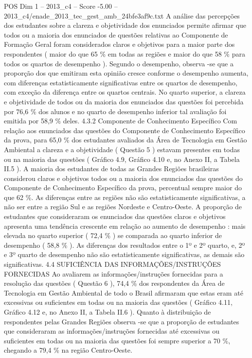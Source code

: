 \begin{textsample}{POS Dim 1 – 2013\_c4 – Score -5.00 – 2013\_c4/enade\_2013\_tec\_gest\_amb\_24bfe3af9c.txt}
A análise das percepções dos estudantes sobre a clareza e objetividade dos enunciados permite afirmar que todos ou a maioria dos enunciados de questões relativas ao Componente de Formação Geral foram considerados claros e objetivos para a maior parte dos respondentes ( maior do que 65 \% em todas as regiões e maior do que 58 \% para todos os quartos de desempenho ).
Segundo o desempenho, observa -se que a proporção dos que emitiram esta opinião cresce conforme o desempenho aumenta, com diferenças estatisticamente significativas entre os quartos de desempenho, com exceção da diferença entre os quartos centrais.
No quarto superior, a clareza e objetividade de todos ou da maioria dos enunciados das questões foi percebida por 76,6 \% dos alunos e no quarto de desempenho inferior tal avaliação foi emitida por 58,9 \% deles. 4.3.2 Componente de Conhecimento Específico Com relação aos enunciados das questões do Componente de Conhecimento Específico da prova, para 65,0 \% dos estudantes avaliados da Área de Tecnologia em Gestão Ambiental a clareza e a objetividade ( Questão 5 ) estavam presentes em todas ou na maioria das questões ( Gráfico 4.9, Gráfico 4.10 e, no Anexo II, a Tabela II.5 ).
A maioria dos estudantes de todas as Grandes Regiões brasileiras considerou claros e objetivos todos ou a maioria dos enunciados das questões do Componente de Conhecimento Específico da prova, percentual sempre maior do que 62 \%.
As diferenças entre as regiões não são estatisticamente significativas, a não ser entre a região Sul e as regiões Nordeste e Centro-Oeste.
A proporção de estudantes que consideraram os enunciados das questões claros e objetivos apresenta uma tendência crescente em relação ao aumento de desempenho : mais elevada no quarto superior ( 72,4 \% ) se comparada ao quarto inferior de desempenho ( 58,8 \% ).
As diferenças dos resultados entre o 1º e 2º quarto, e, 2º e 3º quarto de desempenho não são estatisticamente significativas, as demais são significativas. 4.4 SUFICIÊNCIA DAS INFORMAÇÕES/INSTRUÇÕES FORNECIDAS Ao avaliarem as informações/instruções fornecidas para a resolução das questões ( Questão 6 ), 74,4 \% dos respondentes da Área de Tecnologia em Gestão Ambiental de todo o Brasil afirmaram que estas eram até excessivas ou suficientes em todas ou na maioria das questões ( Gráfico 4.11, Gráfico 4.12 e, no Anexo II, a Tabela II.6 ).
Quanto à distribuição de respondentes pelas Grandes Regiões observa -se que a proporção de estudantes que consideraram as informações/instruções fornecidas até excessivas ou suficientes em todas ou na maioria das questões foi sempre superior a 70 \%, chegando a 79,4 \% na região Centro-Oeste.

\end{textsample}
